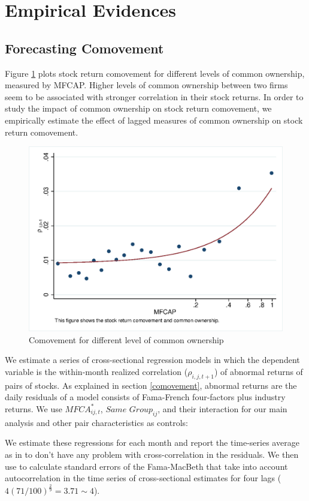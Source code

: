 
\section{Empirical Evidences}



\subsection{{Forecasting Comovement}}
\label{Forecasting Comovement}

	Figure \ref{mcorr50} plots stock return comovement for different levels of common ownership, measured by MFCAP.  Higher levels of common	ownership between two firms seem to be associated with stronger correlation in their stock returns. In order to study the impact of common ownership on stock return comovement, we empirically estimate the effect of lagged measures of common ownership on stock return comovement. 
	\begin{figure}[htbp]
	\centering  
	\centering
	\includegraphics[width=0.7\linewidth]{"Output/mcorr50.eps"} 
	\caption{Comovement for different level of common ownership }
	\label{mcorr50}
\end{figure}
	
	We estimate a series of cross-sectional regression models in which the dependent variable is the within-month realized correlation ($\rho_{i,j,t+1}$) of abnormal returns of pairs of stocks. As explained in section \ref{comovement}, abnormal returns are the daily residuals of a model consists of Fama-French four-factors plus industry returns. We use $\textit{MFCA}^*_{ij,t}$, $\textit{Same Group}_{ij} $, and their interaction for our main analysis and other pair characteristics as controls:
		

	
	We estimate these regressions for each month and report the time-series average as in \cite{FamaMacBeth} to don't have any problem with cross-correlation in the residuals. We then use  \cite{newey1987hypothesis} to calculate standard errors of the Fama-MacBeth that take into account autocorrelation in the time series of cross-sectional estimates for four lags ($ 4(71/100)^{\frac{2}{9}} = 3.71 \sim 4 $).
	
